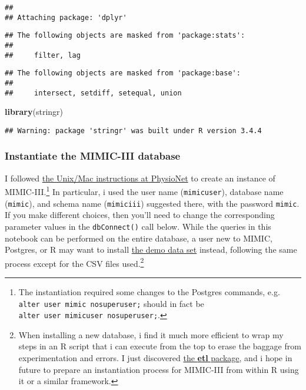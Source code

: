 \documentclass[]{article}
\newenvironment{Shaded}{\begin{snugshade}}{\end{snugshade}}
\newcommand{\KeywordTok}[1]{\textcolor[rgb]{0.13,0.29,0.53}{\textbf{#1}}}
\newcommand{\NormalTok}[1]{#1}
\let\rmarkdownfootnote\footnote%
\def\footnote{\protect\rmarkdownfootnote}
\begin{document}
\begin{verbatim}
## 
## Attaching package: 'dplyr'
\end{verbatim}

\begin{verbatim}
## The following objects are masked from 'package:stats':
## 
##     filter, lag
\end{verbatim}

\begin{verbatim}
## The following objects are masked from 'package:base':
## 
##     intersect, setdiff, setequal, union
\end{verbatim}

\begin{Shaded}
\begin{Highlighting}[]
\KeywordTok{library}\NormalTok{(stringr)}
\end{Highlighting}
\end{Shaded}

\begin{verbatim}
## Warning: package 'stringr' was built under R version 3.4.4
\end{verbatim}

\subsubsection{Instantiate the MIMIC-III
database}\label{instantiate-the-mimic-iii-database}

I followed
\href{https://mimic.physionet.org/tutorials/install-mimic-locally-ubuntu/}{the
Unix/Mac instructions at PhysioNet} to create an instance of
MIMIC-III.\footnote{The instantiation required some changes to the
  Postgres commands, e.g. \texttt{alter\ user\ mimic\ nosuperuser;}
  should in fact be \texttt{alter\ user\ mimicuser\ nosuperuser;}.} In
particular, i used the user name (\texttt{mimicuser}), database name
(\texttt{mimic}), and schema name (\texttt{mimiciii}) suggested there,
with the password \texttt{mimic}. If you make different choices, then
you'll need to change the corresponding parameter values in the
\texttt{dbConnect()} call below. While the queries in this notebook can
be performed on the entire database, a user new to MIMIC, Postgres, or R
may want to install
\href{https://mimic.physionet.org/gettingstarted/demo/}{the demo data
set} instead, following the same process except for the CSV files
used.\footnote{When installing a new database, i find it much more
  efficient to wrap my steps in an R script that i can execute from the
  top to erase the baggage from experimentation and errors. I just
  discovered \href{https://cran.r-project.org/package=etl}{the
  \textbf{etl} package}, and i hope in future to prepare an
  instantiation process for MIMIC-III from within R using it or a
  similar framework.}
\end{document}
